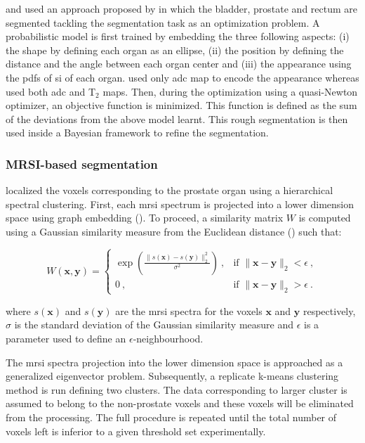 \begin{enumerate}[leftmargin=*]
\cite{Litjens2011} and \cite{Vos2012} used an approach proposed by \cite{Huisman2010} in which the bladder, prostate and rectum are segmented tackling the segmentation task as an optimization problem. A probabilistic model is first trained by embedding the three following aspects: (i) the shape by defining each organ as an ellipse, (ii) the position by defining the distance and the angle between each organ center and (iii) the appearance using the \acp{pdf} of \ac{si} of each organ. \cite{Litjens2011} used only \ac{adc} map to encode the appearance whereas \cite{Vos2012} used both \ac{adc} and T$_2$ maps. Then, during the optimization using a quasi-Newton optimizer, an objective function is minimized. This function is defined as the sum of the deviations from the above model learnt. This rough segmentation is then used inside a Bayesian framework to refine the segmentation.

\end{enumerate}

\subsubsection{MRSI-based segmentation}

\cite{Tiwari2009} localized the voxels corresponding to the prostate organ using a hierarchical spectral clustering. First, each \ac{mrsi} spectrum is projected into a lower dimension space using graph embedding (\cite{Shi2000}). To proceed, a similarity matrix $W$ is computed using a Gaussian similarity measure from the Euclidean distance (\cite{Belkin2001}) such that:

\begin{equation}
	W(\mathbf{x},\mathbf{y}) =
	\begin{cases}	
	 	\exp \left( \frac{\| s(\mathbf{x}) - s(\mathbf{y}) \|_2^2}{\sigma^2} \right) \ , & \text{if } \| \mathbf{x} - \mathbf{y} \|_2 < \epsilon \ , \\
	 	0 \ , & \text{if } \| \mathbf{x} - \mathbf{y} \|_2 > \epsilon \ .
	 \end{cases}
	\label{eq:ge1}
\end{equation}

\noindent where $s(\mathbf{x})$ and $s(\mathbf{y})$ are the \ac{mrsi} spectra for the voxels $\mathbf{x}$ and $\mathbf{y}$ respectively, $\sigma$ is the standard deviation of the Gaussian similarity measure and $\epsilon$ is a parameter used to define an $\epsilon$-neighbourhood.

The \ac{mrsi} spectra projection into the lower dimension space is approached as a generalized eigenvector problem. Subsequently, a replicate k-means clustering method is run defining two clusters. The data corresponding to larger cluster is assumed to belong to the non-prostate voxels and these voxels will be eliminated from the processing. The full procedure is repeated until the total number of voxels left is inferior to a given threshold set experimentally.